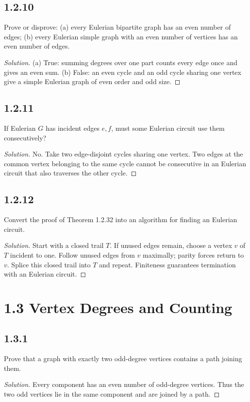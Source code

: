 \documentclass[12pt]{amsart}
\newenvironment{solution}{\begin{proof}[Solution]}{\end{proof}}
\begin{document}
    \subsection*{1.2.10} Prove or disprove: (a) every Eulerian bipartite graph has an even number of edges; (b) every Eulerian simple graph with an even number of vertices has an even number of edges.
    \begin{solution}(a) True: summing degrees over one part counts every edge once and gives an even sum. (b) False: an even cycle and an odd cycle sharing one vertex give a simple Eulerian graph of even order and odd size.\end{solution}
    \subsection*{1.2.11} If Eulerian $G$ has incident edges $e,f$, must some Eulerian circuit use them consecutively?
    \begin{solution}No. Take two edge-disjoint cycles sharing one vertex. Two edges at the common vertex belonging to the same cycle cannot be consecutive in an Eulerian circuit that also traverses the other cycle.\end{solution}
    \subsection*{1.2.12} Convert the proof of Theorem 1.2.32 into an algorithm for finding an Eulerian circuit.
    \begin{solution}Start with a closed trail $T$. If unused edges remain, choose a vertex $v$ of $T$ incident to one. Follow unused edges from $v$ maximally; parity forces return to $v$. Splice this closed trail into $T$ and repeat. Finiteness guarantees termination with an Eulerian circuit.\end{solution}

    \section*{1.3 Vertex Degrees and Counting}
    \subsection*{1.3.1} Prove that a graph with exactly two odd-degree vertices contains a path joining them.
    \begin{solution}Every component has an even number of odd-degree vertices. Thus the two odd vertices lie in the same component and are joined by a path.\end{solution}
\end{document}
